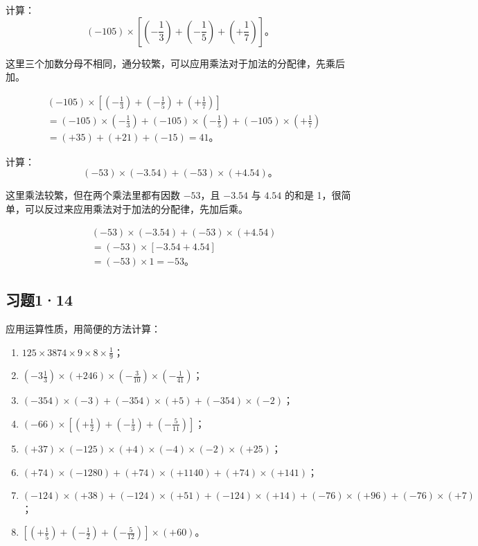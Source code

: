  计算：
\[
(-105) \times \left[\left(-\frac{1}{3}\right) + \left(-\frac{1}{5}\right) + \left(+\frac{1}{7}\right)\right]。
\]

 这里三个加数分母不相同，通分较繁，可以应用乘法对于加法的分配律，先乘后加。

\begin{align*}
&(-105) \times \left[\left(-\frac{1}{3}\right) + \left(-\frac{1}{5}\right) + \left(+\frac{1}{7}\right)\right] \\
&= (-105) \times \left(-\frac{1}{3}\right) + (-105) \times \left(-\frac{1}{5}\right) + (-105) \times \left(+\frac{1}{7}\right) \\
&= (+35) + (+21) + (-15) = 41。
\end{align*}

 计算：
\[
(-53) \times (-3.54) + (-53) \times (+4.54)。
\]

 这里乘法较繁，但在两个乘法里都有因数 $-53$，且 $-3.54$ 与 $4.54$ 的和是 1，很简单，可以反过来应用乘法对于加法的分配律，先加后乘。

\begin{align*}
&(-53) \times (-3.54) + (-53) \times (+4.54) \\
&= (-53) \times [-3.54 + 4.54] \\
&= (-53) \times 1 = -53。
\end{align*}

\subsection{习题1·14}

应用运算性质，用简便的方法计算：

\begin{enumerate}
\item \(125 \times 3874 \times 9 \times 8 \times \frac{1}{9}\)；
\item \(\left(-3\frac{1}{3}\right) \times (+246) \times \left(-\frac{3}{10}\right) \times \left(-\frac{1}{41}\right)\)；
\item \((-354) \times (-3) + (-354) \times (+5) + (-354) \times (-2)\)；
\item \((-66) \times \left[\left(+\frac{1}{2}\right) + \left(-\frac{1}{3}\right) + \left(-\frac{5}{11}\right)\right]\)；
\item \((+37) \times (-125) \times (+4) \times (-4) \times (-2) \times (+25)\)；
\item \((+74) \times (-1280) + (+74) \times (+1140) + (+74) \times (+141)\)；
\item \((-124) \times (+38) + (-124) \times (+51) + (-124) \times (+14) + (-76) \times (+96) + (-76) \times (+7)\)；
\item \(\left[\left(+\frac{1}{5}\right) + \left(-\frac{1}{2}\right) + \left(-\frac{5}{12}\right)\right] \times (+60)\)。
\end{enumerate}

